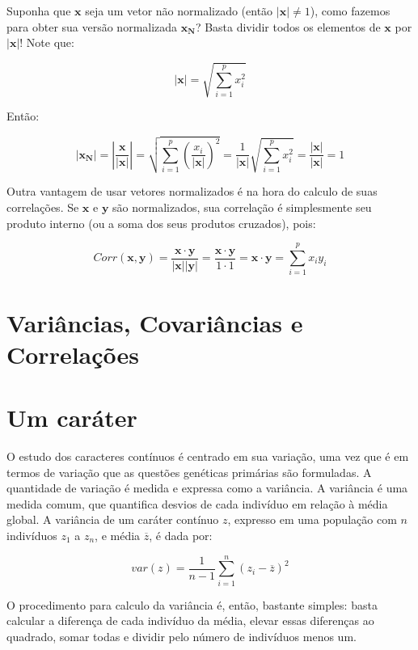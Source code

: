 \documentclass[portuges,]{tufte-handout}
\begin{document}
Suponha que \(\mathbf{x}\) seja um vetor não normalizado (então
\(|\mathbf{x}| \neq 1\)), como fazemos para obter sua versão normalizada
\(\mathbf{x_N}\)? Basta dividir todos os elementos de \(\mathbf{x}\) por
\(|\mathbf{x}|\)! Note que:

\[
|\mathbf{x}| = \sqrt{\sum_{i=1}^p x_i^2}
\]

Então:

\[
|\mathbf{x_N}| = \left| \frac{\mathbf{x}}{|\mathbf{x}|} \right| = \sqrt{\sum_{i=1}^p \left (\frac{x_i}{|\mathbf{x}|} \right )^2} = \frac{1}{|\mathbf{x}|} \sqrt{\sum_{i=1}^p x_i^2} = \frac{|\mathbf{x}|}{|\mathbf{x}|} = 1
\]

Outra vantagem de usar vetores normalizados é na hora do calculo de suas
correlações. Se \(\mathbf{x}\) e \(\mathbf{y}\) são normalizados, sua
correlação é simplesmente seu produto interno (ou a soma dos seus
produtos cruzados), pois:

\[
Corr(\mathbf{x}, \mathbf{y}) = \frac{ \mathbf{x} \cdot \mathbf{y} }{|\mathbf{x}||\mathbf{y}|} = \frac{ \mathbf{x} \cdot \mathbf{y} }{1 \cdot 1} =  \mathbf{x} \cdot \mathbf{y} = \sum_{i=1}^p x_iy_i
\]

\section{Variâncias, Covariâncias e
Correlações}\label{variuxe2ncias-covariuxe2ncias-e-correlauxe7uxf5es}

\section{Um caráter}\label{um-caruxe1ter}

O estudo dos caracteres contínuos é centrado em sua variação, uma vez
que é em termos de variação que as questões genéticas primárias são
formuladas. A quantidade de variação é medida e expressa como a
variância. A variância é uma medida comum, que quantifica desvios de
cada indivíduo em relação à média global. A variância de um caráter
contínuo \(z\), expresso em uma população com \(n\) indivíduos \(z_1\) a
\(z_n\), e média \(\overline z\), é dada por:

\[
var(z) = \frac{1}{n-1}\sum_{i=1}^n (z_i - \overline z)^2
\]

O procedimento para calculo da variância é, então, bastante simples:
basta calcular a diferença de cada indivíduo da média, elevar essas
diferenças ao quadrado, somar todas e dividir pelo número de indivíduos
menos um.
\end{document}
